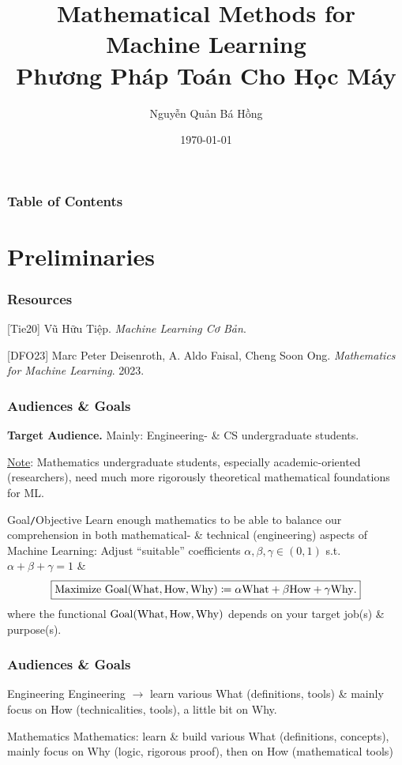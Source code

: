 \documentclass{beamer}
\title{Mathematical Methods for Machine Learning\\Phương Pháp Toán Cho Học Máy}
\author{\sc Nguyễn Quản Bá Hồng}
\institute{UMT, HCMC -- University of Management \& Technology, Ho Chi Minh City}
\date{\today}
\begin{document}
\frame{\titlepage}
\begin{frame}
	\frametitle{Table of Contents}
	\tableofcontents
\end{frame}

\section{Preliminaries}

\begin{frame}
	\frametitle{Resources}
	[Tie20] {\sc Vũ Hữu Tiệp}. {\it Machine Learning Cơ Bản}.
	\vspace{2mm}
	
	[DFO23] {\sc Marc Peter Deisenroth, A. Aldo Faisal, Cheng Soon Ong}. {\it Mathematics for Machine Learning}. 2023.
\end{frame}

\begin{frame}
	\frametitle{Audiences \& Goals}
	{\bf Target Audience.} Mainly: Engineering- \& CS undergraduate students.
	
	\underline{Note}: Mathematics undergraduate students, especially academic-oriented (researchers), need much more rigorously theoretical mathematical foundations for ML.	
	\begin{block}{Goal{\tt/}Objective}
		Learn enough mathematics to be able to balance our comprehension in both mathematical- \& technical (engineering) aspects of Machine Learning: Adjust ``suitable'' coefficients $\alpha,\beta,\gamma\in(0,1)$ s.t. $\alpha + \beta + \gamma = 1$ \&
		\begin{equation}
			 \boxed{\mbox{Maximize } {\rm Goal}({\rm What,How,Why})\coloneqq\alpha{\rm What} + \beta{\rm How} + \gamma{\rm Why}.}
		\end{equation}
		where the functional ${\rm Goal}({\rm What,How,Why})$ depends on your target job(s) \& purpose(s).
	\end{block}
\end{frame}

\begin{frame}
	\frametitle{Audiences \& Goals}
	\begin{block}{Engineering}
		Engineering $\to$ learn various What (definitions, tools) \& mainly focus on How (technicalities, tools), a little bit on Why.
	\end{block}
	
	\begin{block}{Mathematics}
		Mathematics: learn \& build various What (definitions, concepts), mainly focus on Why (logic, rigorous proof), then on How (mathematical tools)
	\end{block}
\end{frame}
\end{document}
